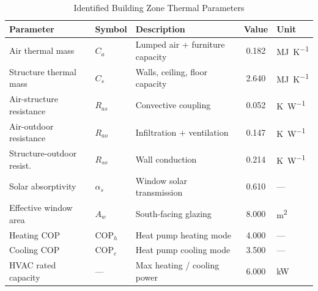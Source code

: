 \documentclass[conference,a4paper]{IEEEtran}[2015/08/26]
\begin{document}
\begin{table}[t]
  \caption{Identified Building Zone Thermal Parameters}
  \label{tab:params}
  \centering
  \begin{tabular}{lllS[table-format=2.3]l}
    \toprule
    \textbf{Parameter} & \textbf{Symbol} & \textbf{Description}
      & {\textbf{Value}} & \textbf{Unit} \\
    \midrule
    Air thermal mass         & $C_a$       & Lumped air + furniture capacity
      & 0.182  & \si{\mega\joule\per\kelvin} \\
    Structure thermal mass   & $C_s$       & Walls, ceiling, floor capacity
      & 2.640  & \si{\mega\joule\per\kelvin} \\
    Air-structure resistance & $R_{as}$    & Convective coupling
      & 0.052  & \si{\kelvin\per\watt} \\
    Air-outdoor resistance   & $R_{ao}$    & Infiltration + ventilation
      & 0.147  & \si{\kelvin\per\watt} \\
    Structure-outdoor resist.& $R_{so}$    & Wall conduction
      & 0.214  & \si{\kelvin\per\watt} \\
    Solar absorptivity       & $\alpha_s$  & Window solar transmission
      & 0.610  & --- \\
    Effective window area    & $A_w$       & South-facing glazing
      & 8.000  & \si{\metre\squared} \\
    Heating COP              & $\mathrm{COP}_h$ & Heat pump heating mode
      & 4.000  & --- \\
    Cooling COP              & $\mathrm{COP}_c$ & Heat pump cooling mode
      & 3.500  & --- \\
    HVAC rated capacity      & ---         & Max heating / cooling power
      & 6.000  & \si{\kilo\watt} \\
    \bottomrule
  \end{tabular}
\end{table}
\end{document}
